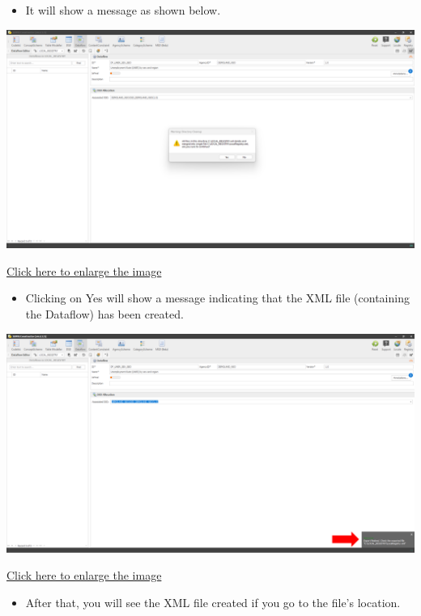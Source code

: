\documentclass[
]{book}
\providecommand{\tightlist}{%
  \setlength{\itemsep}{0pt}\setlength{\parskip}{0pt}}
\begin{document}
\begin{itemize}
\tightlist
\item
  It will show a message as shown below.
\end{itemize}

\begin{center}\includegraphics[width=1\linewidth]{./images/image269} \end{center}

\href{images/image269.png}{Click here to enlarge the image}

\begin{itemize}
\tightlist
\item
  Clicking on Yes will show a message indicating that the XML file (containing the Dataflow) has been created.
\end{itemize}

\begin{center}\includegraphics[width=1\linewidth]{./images/image270} \end{center}

\href{images/image270.png}{Click here to enlarge the image}

\begin{itemize}
\tightlist
\item
  After that, you will see the XML file created if you go to the file's location.
\end{itemize}
\end{document}
